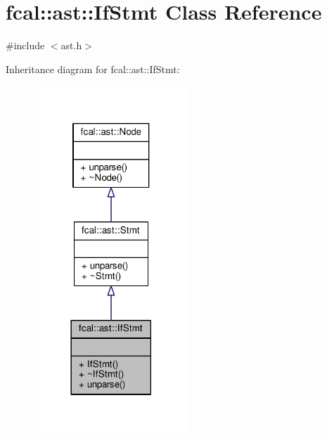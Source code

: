\hypertarget{classfcal_1_1ast_1_1IfStmt}{}\section{fcal\+:\+:ast\+:\+:If\+Stmt Class Reference}
\label{classfcal_1_1ast_1_1IfStmt}


{\ttfamily \#include $<$ast.\+h$>$}



Inheritance diagram for fcal\+:\+:ast\+:\+:If\+Stmt\+:
\nopagebreak
\begin{figure}[H]
\begin{center}
\leavevmode
\includegraphics[width=165pt]{classfcal_1_1ast_1_1IfStmt__inherit__graph}
\end{center}
\end{figure}


